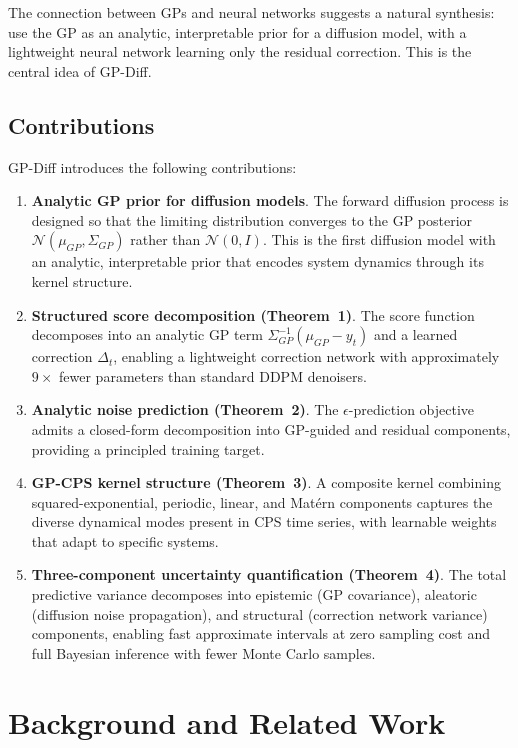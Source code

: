 \documentclass[conference]{IEEEtran}
\begin{document}
The connection between GPs and neural networks suggests a natural synthesis: use the GP as an analytic, interpretable prior for a diffusion model, with a lightweight neural network learning only the residual correction. This is the central idea of GP-Diff.

\subsection{Contributions}

GP-Diff introduces the following contributions:

\begin{enumerate}
    \item \textbf{Analytic GP prior for diffusion models}. The forward diffusion process is designed so that the limiting distribution converges to the GP posterior $\mathcal{N}(\mu_{GP}, \Sigma_{GP})$ rather than $\mathcal{N}(0, I)$. This is the first diffusion model with an analytic, interpretable prior that encodes system dynamics through its kernel structure.
    \item \textbf{Structured score decomposition (Theorem~1)}. The score function decomposes into an analytic GP term $\Sigma_{GP}^{-1}(\mu_{GP} - y_t)$ and a learned correction $\Delta_t$, enabling a lightweight correction network with approximately $9\times$ fewer parameters than standard DDPM denoisers.
    \item \textbf{Analytic noise prediction (Theorem~2)}. The $\epsilon$-prediction objective admits a closed-form decomposition into GP-guided and residual components, providing a principled training target.
    \item \textbf{GP-CPS kernel structure (Theorem~3)}. A composite kernel combining squared-exponential, periodic, linear, and Mat\'ern components captures the diverse dynamical modes present in CPS time series, with learnable weights that adapt to specific systems.
    \item \textbf{Three-component uncertainty quantification (Theorem~4)}. The total predictive variance decomposes into epistemic (GP covariance), aleatoric (diffusion noise propagation), and structural (correction network variance) components, enabling fast approximate intervals at zero sampling cost and full Bayesian inference with fewer Monte Carlo samples.
\end{enumerate}

\section{Background and Related Work}
\end{document}

